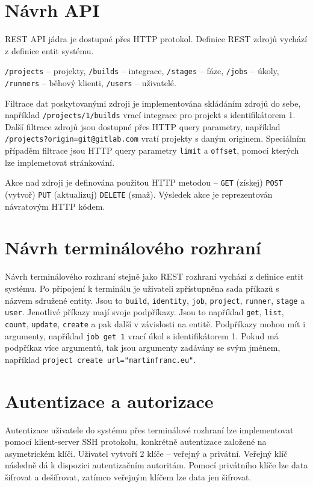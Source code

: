 \section{Návrh API}

REST API jádra je dostupné přes HTTP protokol.
Definice REST zdrojů vychází z definice entit systému.

\verb|/projects| -- projekty,
\verb|/builds| -- integrace,
\verb|/stages| -- fáze,
\verb|/jobs| -- úkoly,
\verb|/runners| -- běhový klienti,
\verb|/users| -- uživatelé.

Filtrace dat poskytovanými zdroji je implementována skládáním zdrojů do sebe, například \verb|/projects/1/builds| vrací integrace pro projekt s identifikátorem 1.
Další filtrace zdrojů jsou dostupné přes HTTP query parametry, například \verb|/projects?origin=git@gitlab.com| vratí projekty s daným originem.
Speciálním případěm filtrace jsou HTTP query parametry \verb|limit| a \verb|offset|, pomocí kterých lze implemetovat stránkování.

Akce nad zdroji je definována použitou HTTP metodou -- \verb|GET| (získej) \verb|POST| (vytvoř) \verb|PUT| (aktualizuj) \verb|DELETE| (smaž).
Výsledek akce je reprezentován návratovým HTTP kódem.

\section{Návrh terminálového rozhraní}

Návrh terminálového rozhraní stejně jako REST rozhraní vychází z definice entit systému.
Po připojení k terminálu je uživateli zpřístupněna sada příkazů s názvem sdružené entity.
Jsou to \verb|build|, \verb|identity|, \verb|job|, \verb|project|, \verb|runner|, \verb|stage| a \verb|user|.
Jenotlivé příkazy mají svoje podpříkazy.
Jsou to například \verb|get|, \verb|list|, \verb|count|, \verb|update|, \verb|create| a pak další v závislosti na entitě.
Podpříkazy mohou mít i argumenty, například \verb|job get 1| vrací úkol s identifikátorem 1.
Pokud má podpříkaz více argumentů, tak jsou argumenty zadávány se svým jménem, například \verb|project create url="martinfranc.eu"|.

\section{Autentizace a autorizace}

Autentizace uživatele do systému přes terminálové rozhraní lze implementovat pomocí klient-server SSH protokolu, konkrétně autentizace založené na asymetrickém klíči.
Uživatel vytvoří 2 klíče -- veřejný a privátní.
Veřejný klíč následně dá k dispozici autentizačním autoritám.
Pomocí privátního klíče lze data šifrovat a dešífrovat, zatímco veřejným klíčem lze data jen šifrovat.

